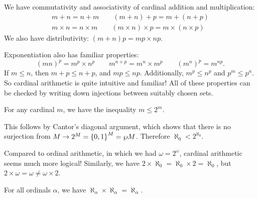 \documentclass{article}
\begin{document}
\begin{remark}
    We have commutativity and associativity of cardinal addition and multiplication:
    \begin{align*}
	    m + n = n + m \qquad (m + n) + p = m + (n + p) \\
	    m \times n = n \times m \qquad (m \times n) \times p = m \times (n \times p)
	\end{align*}
	We also have distributivity: $(m+n)p = mp \times np$.
	
	Exponentiation also has familiar properties:
	\[
	(mn)^p = m^p \times n^p \qquad m^{n + p} = m^n \times m^p \qquad (m^n)^p = m^{np}.
	\]
	If $m \leq n$, then $m + p \leq n + p$, and $mp \leq np$. Additionally, $m^p \leq n^p$ and $p^m \leq p^n$. So cardinal arithmetic is quite intuitive and familiar! All of these properties can be checked by writing down injections between suitably chosen sets.
\end{remark}

\begin{proposition}[$m \leq 2^m$]
    For any cardinal $m$, we have the inequality $m \leq 2^m$.
\end{proposition}

\begin{prf}
    This follows by Cantor's diagonal argument, which shows that there is no surjection from $M \to 2^M = \left\lbrace 0, 1 \right\rbrace^M= \wp M$. Therefore $\aleph_0 < 2^{\aleph_0}$.
\end{prf}

\begin{note}
	Compared to ordinal arithmetic, in which we had $\omega = 2^\omega$, cardinal arithmetic seems much more logical! Similarly, we have $2 \times \aleph_0 = \aleph_0 \times 2 = \aleph_0$, but $2 \times \omega = \omega \neq \omega \times 2$.
\end{note}

\begin{theorem}
    For all ordinals $\alpha$, we have $\aleph_\alpha \times \aleph_\alpha = \aleph_\alpha$.
\end{theorem}
\end{document}
